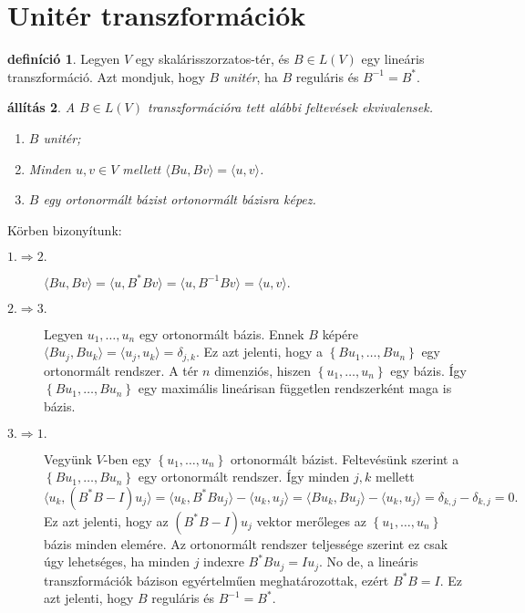 \documentclass[9pt, a4paper, showtrims]{memoir}
\makeatletter
\renewenvironment{proof}[1][\proofname]
    {\par\pushQED{\qed}%
    \normalfont \topsep6\p@\@plus6\p@\relax
    \trivlist
    \item[\hskip\labelsep
        \itshape
    #1\@addpunct{:}]\ignorespaces}
    {\popQED\endtrivlist\@endpefalse}
\theoremstyle{plain}
\newtheorem{proposition}{állítás}[chapter]
\theoremstyle{remark}
\theoremstyle{definition}
\newtheorem{definition}[proposition]{definíció}
\newcommand{\ip}[2]{\langle#1,#2\rangle}
\makeatother
\begin{document}
\section{Unitér transzformációk}
\begin{definition}
	Legyen $V$ egy skalárisszorzatos-tér, és $B\in L\left( V \right)$ egy lineáris transzformáció.
	Azt mondjuk, hogy $B$
	\emph{unitér},
	ha $B$ reguláris és $B^{-1}=B^\ast$.
\end{definition}
\begin{proposition}
	A $B\in L\left( V \right)$ transzformációra tett alábbi feltevések ekvivalensek.
	\begin{enumerate}
		\item $B$ unitér;
		\item Minden $u,v\in V$ mellett $\ip{Bu}{Bv}=\ip{u}{v}$.
		\item $B$ egy ortonormált bázist ortonormált bázisra képez.
		      \qedhere
	\end{enumerate}
\end{proposition}
\begin{proof}
	Körben bizonyítunk:
	\begin{description}
		\item[$1.\Rightarrow 2.$]
		      \begin{math}
			      \ip{Bu}{Bv}
			      =
			      \ip{u}{B^\ast Bv}
			      =
			      \ip{u}{B^{-1}Bv}
			      =
			      \ip{u}{v}.
		      \end{math}
		\item[$2.\Rightarrow 3.$]
		      Legyen $u_1,\ldots,u_n$ egy ortonormált bázis.
		      Ennek $B$ képére
		      \begin{math}
			      \ip{Bu_j}{Bu_k}
			      =
			      \ip{u_j}{u_k}
			      =\delta_{j,k}.
		      \end{math}
		      Ez azt jelenti, hogy a $\left\{ Bu_1,\ldots,Bu_n \right\}$ egy ortonormált rendszer.
		      A tér $n$ dimenziós, hiszen $\left\{ u_1,\ldots,u_n \right\}$ egy bázis.
		      Így
		      $\left\{ Bu_1,\ldots,Bu_n \right\}$ egy maximális lineárisan független rendszerként maga is bázis.
		\item[$3.\Rightarrow 1.$]
		      Vegyünk $V$-ben egy $\left\{ u_1,\ldots,u_n \right\}$ ortonormált bázist.
		      Feltevésünk szerint a $\left\{ Bu_1,\ldots,Bu_n \right\}$ egy ortonormált rendszer.
		      Így minden $j,k$ mellett
		      \begin{displaymath}
			      \ip{u_k}{\left( B^\ast B-I \right)u_j}
			      =
			      \ip{u_k}{B^\ast Bu_j}-\ip{u_k}{u_j}
			      =
			      \ip{Bu_k}{Bu_j}-\ip{u_k}{u_j}
			      =
			      \delta_{k,j}-\delta_{k,j}
			      =
			      0.
		      \end{displaymath}
		      Ez azt jelenti, hogy az $(B^\ast B-I)u_j$ vektor merőleges az $\left\{ u_1,\ldots,u_n \right\}$ bázis minden elemére.
		      Az ortonormált rendszer teljessége szerint ez csak úgy lehetséges, ha minden $j$ indexre $B^\ast Bu_j=Iu_j$.
		      No de, a lineáris transzformációk bázison egyértelműen meghatározottak,
		      ezért $B^\ast B=I$.
		      Ez azt jelenti, hogy $B$ reguláris és $B^{-1}=B^\ast$.
	\end{description}
\end{proof}
\end{document}

